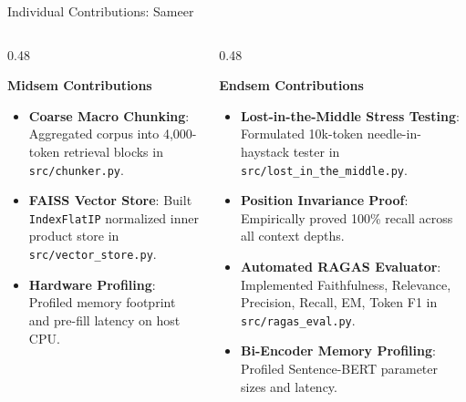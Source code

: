 \documentclass[10pt,aspectratio=169]{beamer}
\begin{document}
\begin{frame}{Individual Contributions: Sameer}
    \begin{columns}[onlytextwidth,T]
        \begin{column}{0.48\textwidth}
            \begin{block}{\textbf{Midsem Contributions}}
                \footnotesize
                \begin{itemize}\setlength\itemsep{3pt}
                    \item \textbf{Coarse Macro Chunking}: Aggregated corpus into 4,000-token retrieval blocks in \texttt{src/chunker.py}.
                    \item \textbf{FAISS Vector Store}: Built \texttt{IndexFlatIP} normalized inner product store in \texttt{src/vector\_store.py}.
                    \item \textbf{Hardware Profiling}: Profiled memory footprint and pre-fill latency on host CPU.
                \end{itemize}
            \end{block}
        \end{column}
        
        \begin{column}{0.48\textwidth}
            \begin{block}{\textbf{Endsem Contributions}}
                \footnotesize
                \begin{itemize}\setlength\itemsep{3pt}
                    \item \textbf{Lost-in-the-Middle Stress Testing}: Formulated 10k-token needle-in-haystack tester in \texttt{src/lost\_in\_the\_middle.py}.
                    \item \textbf{Position Invariance Proof}: Empirically proved 100\% recall across all context depths.
                    \item \textbf{Automated RAGAS Evaluator}: Implemented Faithfulness, Relevance, Precision, Recall, EM, Token F1 in \texttt{src/ragas\_eval.py}.
                    \item \textbf{Bi-Encoder Memory Profiling}: Profiled Sentence-BERT parameter sizes and latency.
                \end{itemize}
            \end{block}
        \end{column}
    \end{columns}
\end{frame}
\end{document}
